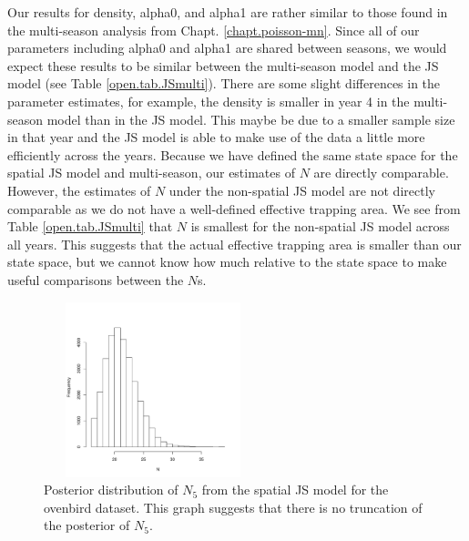 Our results for density, alpha0, and alpha1 are rather similar to those found in the multi-season
analysis from Chapt. \ref{chapt.poisson-mn}.
Since all of our parameters including alpha0 and alpha1 are shared between seasons, we
would expect these results to be similar between the multi-season model and the JS model (see Table \ref{open.tab.JSmulti}).
There are some slight differences in the parameter estimates, for example, the density is smaller
in year 4 in the multi-season model than in the JS model.  This maybe be due to a smaller sample size in that year and the JS model is able to
make use of the data a little more efficiently across the years.   Because we have defined the same state space for
the spatial JS model and multi-season, our estimates of $N$ are directly comparable.  However, the estimates of $N$
under the  non-spatial JS model are not directly comparable as we do not have a well-defined effective trapping area.
We see from Table \ref{open.tab.JSmulti} that $N$ is smallest for the non-spatial JS model across all years.
This suggests that the actual effective trapping area is smaller than our state space, but we cannot know how much relative to the state space to make useful comparisons between the $N$s.


\begin{figure}
\centering
\includegraphics[height=2in,width=2.5in]{Ch16-Open/figs/Nhat5ovenbird.pdf}
\caption{Posterior distribution of $N_5$ from the spatial JS model for the ovenbird dataset.  This graph suggests that there is no truncation of the posterior of $N_5$. }
\label{open.figs.ovenbirdN5hist}
\end{figure}

